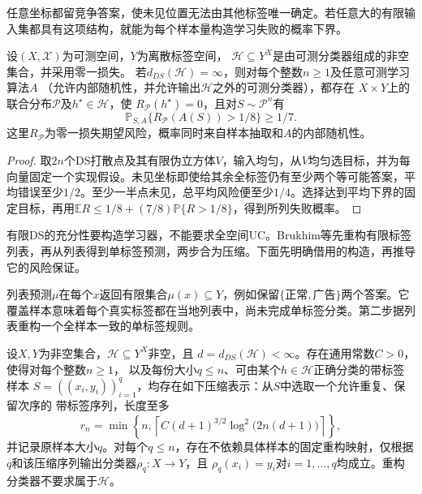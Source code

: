 任意坐标都留竞争答案，使未见位置无法由其他标签唯一确定。若任意大的有限输入集都具有这项结构，就能为每个样本量构造学习失败的概率下界。

\begin{theorem}[无限DS维的不可学习性]
\label{thm:infinite-ds-lower-bound}
设$(X,\mathcal X)$为可测空间，$Y$为离散标签空间，
$\mathcal H\subseteq Y^X$是由可测分类器组成的非空集合，并采用零一损失。
若$d_{DS}(\mathcal H)=\infty$，则对每个整数$n\geq1$及任意可测学习算法$A$
（允许内部随机性，并允许输出$\mathcal H$之外的可测分类器），都存在
$X\times Y$上的联合分布$\mathcal P$及$h^\star\in\mathcal H$，使
$R_{\mathcal P}(h^\star)=0$，且对$S\sim\mathcal P^n$有
\[
 \mathbb P_{S,A}\{R_{\mathcal P}(A(S))>1/8\}\geq1/7.
\]
这里$R_{\mathcal P}$为零一损失期望风险，概率同时来自样本抽取和$A$的内部随机性。
\end{theorem}

\begin{proof}
取$2n$个DS打散点及其有限伪立方体$V$，输入均匀，从$V$均匀选目标，并为每向量固定一个实现假设。未见坐标即使给其余全标签仍有至少两个等可能答案，平均错误至少$1/2$。至少一半点未见，总平均风险便至少$1/4$。选择达到平均下界的固定目标，再用$\mathbb E R\leq1/8+(7/8)\mathbb P\{R>1/8\}$，得到所列失败概率。
\end{proof}

有限DS的充分性要构造学习器，不能要求全空间UC。Brukhim等先重构有限标签列表，再从列表得到单标签预测，两步合为压缩。下面先明确借用的构造，再推导它的风险保证。

列表预测$\mu$在每个$x$返回有限集合$\mu(x)\subseteq Y$，例如保留$\{\text{正常},\text{广告}\}$两个答案。它覆盖样本意味着每个真实标签都在当地列表中，尚未完成单标签分类。第二步据列表重构一个全样本一致的单标签规则。

\begin{lemma}[有限DS维的压缩构造]
\label{lem:finite-ds-compression}
设$X,Y$为非空集合，$\mathcal H\subseteq Y^X$非空，且
$d=d_{DS}(\mathcal H)<\infty$。存在通用常数$C>0$，使得对每个整数$n\geq1$，
以及每份大小$q\leq n$、可由某个$h\in\mathcal H$正确分类的带标签样本
$S=((x_i,y_i))_{i=1}^q$，均存在如下压缩表示：从$S$中选取一个允许重复、保留次序的
带标签序列，长度至多
\[
 r_n=\min\!\left\{n,\left\lceil
 C(d+1)^{3/2}\log^2\!\bigl(2n(d+1)\bigr)\right\rceil\right\},
\]
并记录原样本大小$q$。对每个$q\leq n$，存在不依赖具体样本的固定重构映射，仅根据
$q$和该压缩序列输出分类器$\rho_q:X\to Y$，且
$\rho_q(x_i)=y_i$对$i=1,\ldots,q$均成立。重构分类器不要求属于$\mathcal H$。
\end{lemma}

